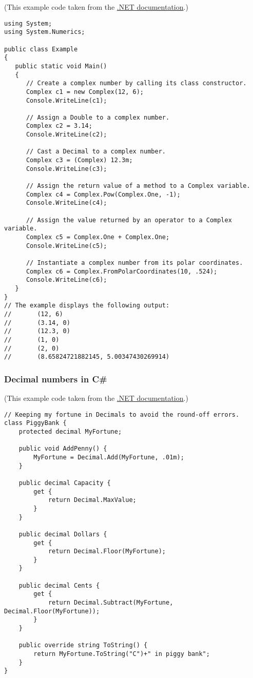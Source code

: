\documentclass[11pt]{article}
\theoremstyle{definition}
\begin{document}
(This example code taken from the
\href{https://docs.microsoft.com/en-us/dotnet/api/system.numerics.complex?view=netcore-3.1}{.NET documentation}.)
\begin{verbatim}
using System;
using System.Numerics;

public class Example
{
   public static void Main()
   {
      // Create a complex number by calling its class constructor.
      Complex c1 = new Complex(12, 6);
      Console.WriteLine(c1);

      // Assign a Double to a complex number.
      Complex c2 = 3.14;
      Console.WriteLine(c2);

      // Cast a Decimal to a complex number.
      Complex c3 = (Complex) 12.3m;
      Console.WriteLine(c3);

      // Assign the return value of a method to a Complex variable.
      Complex c4 = Complex.Pow(Complex.One, -1);
      Console.WriteLine(c4);

      // Assign the value returned by an operator to a Complex variable.
      Complex c5 = Complex.One + Complex.One;
      Console.WriteLine(c5);

      // Instantiate a complex number from its polar coordinates.
      Complex c6 = Complex.FromPolarCoordinates(10, .524);
      Console.WriteLine(c6);
   }
}
// The example displays the following output:
//       (12, 6)
//       (3.14, 0)
//       (12.3, 0)
//       (1, 0)
//       (2, 0)
//       (8.65824721882145, 5.00347430269914)
\end{verbatim}

\subsubsection{Decimal numbers in C\#}
\label{sec:orgdf17fc0}

(This example code taken from the
\href{https://docs.microsoft.com/en-us/dotnet/api/system.decimal?view=netcore-3.1}{.NET documentation}.)
\begin{verbatim}
// Keeping my fortune in Decimals to avoid the round-off errors.
class PiggyBank {
    protected decimal MyFortune;

    public void AddPenny() {
        MyFortune = Decimal.Add(MyFortune, .01m);
    }

    public decimal Capacity {
        get {
            return Decimal.MaxValue;
        }
    }

    public decimal Dollars {
        get {
            return Decimal.Floor(MyFortune);
        }
    }

    public decimal Cents {
        get {
            return Decimal.Subtract(MyFortune, Decimal.Floor(MyFortune));
        }
    }

    public override string ToString() {
        return MyFortune.ToString("C")+" in piggy bank";
    }
}
\end{verbatim}
\end{document}
